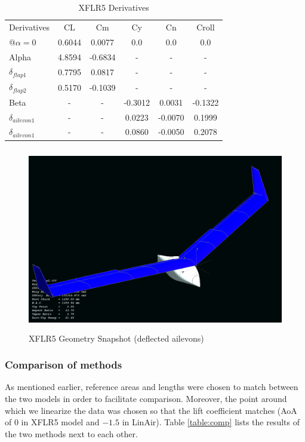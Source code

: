\documentclass[titlepage,10pt]{article}
\begin{document}
\begin{table}[h]
\begin{center}
\begin{tabular}{|l | c | c | c| c| c|}
\hline
Derivatives	&CL      		&Cm      	&Cy    &  	Cn      &	Croll   \\
@$\alpha=0$  &0.6044			&0.0077         &0.0    &       0.0     &   0.0 \\
\hline
Alpha 		 &4.8594		&-0.6834      & -  &  - &  - \\
$\delta_{flap1}$ &0.7795		&0.0817      & -  &  - &  - \\
$\delta_{flap2}$ &0.5170		&-0.1039      & -  &  - &  - \\
\hline
Beta		 & - 		        &-	      & -0.3012  &  0.0031 &  -0.1322 \\
$\delta_{ailevon1}$ & - 	        &-	      & 0.0223 &  -0.0070 &  0.1999 \\
$\delta_{ailevon1}$ & - 	        &-	      & 0.0860 &  -0.0050 &  0.2078 \\
\hline
\end{tabular}
\end{center}
\caption{XFLR5 Derivatives}
\label{table:XFLR5}
\end{table}



\begin{figure}[hb]
\begin{center}
\includegraphics[height = 80mm]{xflr5.png}
\end{center}
\caption{XFLR5 Geometry Snapshot (deflected ailevons)}
\label{xflr}
\end{figure}



\clearpage
\subsubsection{Comparison of methods}
As mentioned earlier, reference areas and lengths were chosen to match between the two models in order to facilitate comparison. Moreover, the point around which we linearize the data was chosen so that the lift coefficient matches (AoA of $0$ in XFLR5 model and $-1.5$ in LinAir). Table \ref{table:comp} lists the results of the two methods next to each other.
\end{document}
